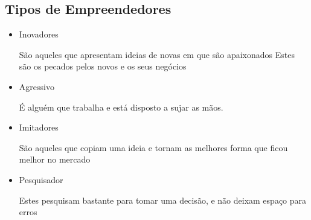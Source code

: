 \subsection{Tipos de Empreendedores}



\begin{itemize}
      \item Inovadores
      
            São aqueles que apresentam ideias de novas em que são apaixonados Estes
            são os pecados pelos novos e os seus negócios

      \item Agressivo

            É alguém que trabalha e está disposto a sujar as mãos.

      \item Imitadores

            São aqueles que copiam uma ideia e tornam as melhores forma que ficou
            melhor no mercado

      \item Pesquisador

            Estes pesquisam bastante para tomar uma decisão, e não deixam espaço
            para erros

\end{itemize}
